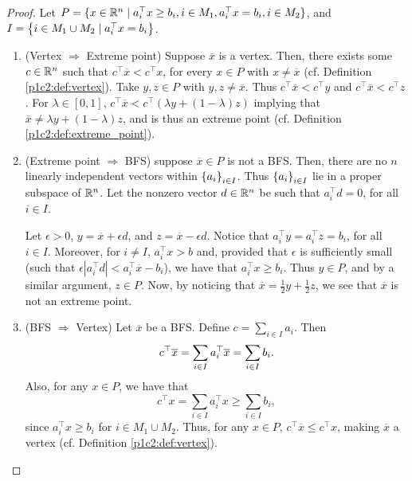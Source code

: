 \begin{proof}
	Let $P =\{ x \in \mathbb{R}^n \mid a_i^\top x \geq b_i, i \in M_1, a_i^\top x = b_i, i \in M_2\}$, and $I = \left\{ i \in M_1 \cup M_2 \mid a_i^\top x = b_i \right \}$.
	
	\begin{enumerate}
		\item (Vertex $\Rightarrow$ Extreme point) Suppose $\overline{x}$ is a vertex. Then, there exists some $c \in \mathbb{R}^n$ such that $c^\top\overline{x} < c^\top x$, for every $x \in P$ with $x \neq \overline{x}$ (cf. Definition \ref{p1c2:def:vertex}). Take $y,z \in P$ with $y,z \neq \overline{x}$. Thus $c^\top\overline{x} < c^\top y$ and $c^\top\overline{x} < c^\top z$. For $\lambda \in [0,1]$, $c^\top \overline{x} < c^\top(\lambda y + (1-\lambda)z)$ implying that $\overline{x} \neq \lambda y + (1-\lambda)z$, and is thus an extreme point (cf. Definition \ref{p1c2:def:extreme_point}).
		
		\item (Extreme point $\Rightarrow$ BFS) suppose $\overline{x} \in P$ is not a BFS. Then, there are no $n$ linearly independent vectors within $\left\{ a_i \right \}_{i \in I}$. Thus $\left\{ a_i \right \}_{i \in I}$ lie in a proper subspace of $\mathbb{R}^n$. Let the nonzero vector $d \in \mathbb{R}^n$ be such that $a_i^\top d = 0$, for all $i \in I$.
			
			Let $\epsilon > 0$, $y = \overline{x} + \epsilon d$, and $z = \overline{x} - \epsilon d$. Notice that $a_i^\top y = a_i^\top z = b_i$, for all $i \in I$. Moreover, for $i \neq I$, $a_i^\top x > b$ and, provided that $\epsilon$ is sufficiently small (such that $\epsilon|a_i^\top d| < a_i ^\top \overline{x} - b_i $), we have that $a_i ^\top x \geq b_i$. Thus $y \in P$, and by a similar argument, $z \in P$. Now, by noticing that $\overline{x} = \frac{1}{2}y + \frac{1}{2}z$, we see that $\overline{x}$ is not an extreme point. 			 
		\item (BFS $\Rightarrow$ Vertex) Let $\overline{x}$ be a BFS. Define $c = \sum_{i \in I} a_i$. Then
			\begin{equation*}
				c^\top \overline{x} = \linebreak \sum_{i \in I} a_i^\top \overline{x} = \sum_{i \in I} b_i.	 			 	
	 		\end{equation*}
			Also, for any $x \in P$, we have that 
			\begin{equation*}
				c^\top x = \sum_{i \in I} a_i^\top x \geq \sum_{i \in I} b_i, 	 	
	 		\end{equation*}
	 		since $a_i^\top x \geq b_i$ for $i \in M_1 \cup M_2$. Thus, for any $x \in P$, $c^\top \overline{x} \leq c^\top x$, making $\overline{x}$ a vertex (cf. Definition \ref{p1c2:def:vertex}). \qedhere
	\end{enumerate} 	
\end{proof}

